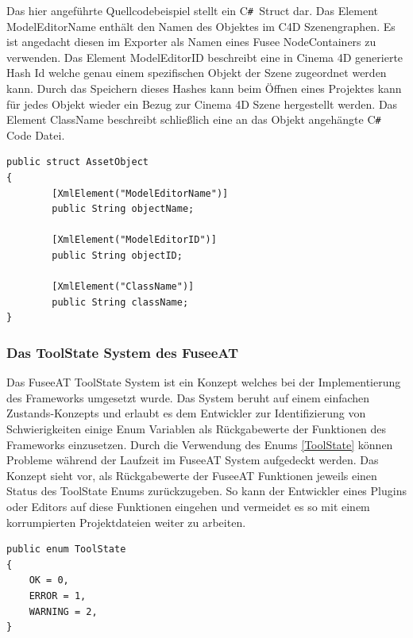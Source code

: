 \documentclass[pagesize, paper=a4, fontsize=12pt, titlepage=true, headings=small, headnosepline, abstractoff, liststotoc, nochapterprefix, plainheadsepline, twoside]{scrreprt}
\newcommand{\CSS}{C\texttt{\# }}
\begin{document}
Das hier angeführte Quellcodebeispiel stellt ein \CSS Struct dar. Das Element ModelEditorName enthält den Namen des Objektes im C4D Szenengraphen. Es ist angedacht diesen im Exporter als Namen eines Fusee NodeContainers zu verwenden. Das Element ModelEditorID beschreibt eine in Cinema 4D generierte Hash Id welche genau einem spezifischen Objekt der Szene zugeordnet werden kann. Durch das Speichern dieses Hashes kann beim Öffnen eines Projektes kann für jedes Objekt wieder ein Bezug zur Cinema 4D Szene hergestellt werden. Das Element ClassName beschreibt schließlich eine an das Objekt angehängte \CSS Code Datei.
\begin{lstlisting}[label=ToolState, caption=Asset Informationsspeicher Objekt. Kann zu XML serialisiert werden.]
public struct AssetObject
{
        [XmlElement("ModelEditorName")]
        public String objectName;

        [XmlElement("ModelEditorID")]
        public String objectID;

        [XmlElement("ClassName")]
        public String className; 
}
\end{lstlisting}

\subsubsection{Das ToolState System des FuseeAT}
Das FuseeAT ToolState System ist ein Konzept welches bei der Implementierung des Frameworks umgesetzt wurde. Das System beruht auf einem einfachen Zustands-Konzepts und erlaubt es dem Entwickler zur Identifizierung von Schwierigkeiten einige Enum Variablen als Rückgabewerte der Funktionen des Frameworks einzusetzen. Durch die Verwendung des Enums \ref{ToolState} können Probleme während der Laufzeit im FuseeAT System aufgedeckt werden. Das Konzept sieht vor, als Rückgabewerte der FuseeAT Funktionen jeweils einen Status des ToolState Enums zurückzugeben. So kann der Entwickler eines Plugins oder Editors auf diese Funktionen eingehen und vermeidet es so mit einem korrumpierten Projektdateien weiter zu arbeiten.
\begin{lstlisting}[label=ToolState, caption=ToolState System: Unterstützt die Stabilität des FuseeAT bei der Zusammenarbeit mit Plugins.]
public enum ToolState
{
	OK = 0,
	ERROR = 1,
	WARNING = 2,
}
\end{lstlisting}
\end{document}

